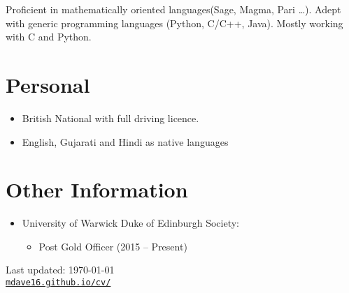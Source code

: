 \documentclass[letterpaper]{article}
\def\footerlink{mdave16.github.io/cv/}
\begin{document}
	Proficient in mathematically oriented languages(Sage, Magma, Pari \dots). Adept with generic programming languages (Python, C/C++, Java). Mostly working with C and Python.
	
	\section*{Personal}
	\begin{itemize}
		\item British National with full driving licence.
		\item English, Gujarati and Hindi as native languages
		
	\end{itemize}
	\section*{Other Information}
	\begin{itemize}
		\item University of Warwick Duke of Edinburgh Society:
		\begin{itemize}
			\item Post Gold Officer (2015 -- Present)
		\end{itemize}
		 
	\end{itemize}
	\bigskip
	\begin{center}
		\begin{footnotesize}
			Last updated: \today \\
			\href{\footerlink}{\texttt{\footerlink}}
		\end{footnotesize}
	\end{center}
\end{document}
